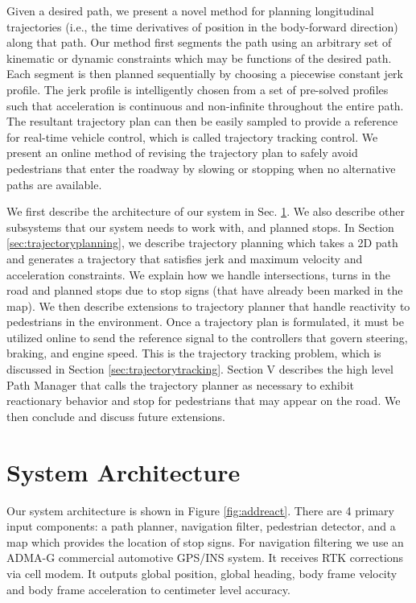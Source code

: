 \documentclass[letterpaper, 10 pt, conference]{ieeeconf}  %
\begin{document}
Given a desired path, we present a novel method for planning longitudinal trajectories (i.e., the time derivatives of position in the body-forward direction) along that path.
Our method first segments the path using an arbitrary set of kinematic or dynamic constraints which may be functions of the desired path.
Each segment is then planned sequentially by choosing a piecewise constant jerk profile.
The jerk profile is intelligently chosen from a set of pre-solved profiles such that acceleration is continuous and non-infinite throughout the entire path.
The resultant trajectory plan can then be easily sampled to provide a reference for real-time vehicle control, which is called trajectory tracking control.
We present an online method of revising the trajectory plan to safely avoid pedestrians that enter the roadway by slowing or stopping when no alternative paths are available.

We first describe the architecture of our system in Sec. \ref{sec:systemarchirecture}.
We also describe other subsystems that our system needs to work with, and planned stops.
In Section \ref{sec:trajectoryplanning}, we describe trajectory planning which takes a 2D path and generates a trajectory that satisfies jerk and maximum velocity and acceleration constraints. 
We explain how we handle intersections, turns in the road and planned stops due to stop signs (that have already been marked in the map).
We then describe extensions to trajectory planner that handle reactivity to pedestrians in the environment. 
Once a trajectory plan is formulated, it must be utilized online to send the reference signal to the controllers that govern steering, braking, and engine speed.
This is the trajectory tracking problem, which is discussed in Section \ref{sec:trajectorytracking}.
Section V describes the high level Path Manager that calls the trajectory planner as necessary to 
exhibit reactionary behavior and stop for pedestrians that may appear on the road.
We then conclude and discuss future extensions.


\section{System Architecture} \label{sec:systemarchirecture}

Our system architecture is shown in Figure \ref{fig:addreact}.
There are 4 primary input components: a path planner, navigation filter, pedestrian detector, and a map which provides the location of stop signs.
For navigation filtering we use an ADMA-G  commercial automotive GPS/INS system.
It receives RTK corrections via cell modem.
It outputs global position, global heading, body frame velocity and body frame acceleration to centimeter level accuracy.
\end{document}
